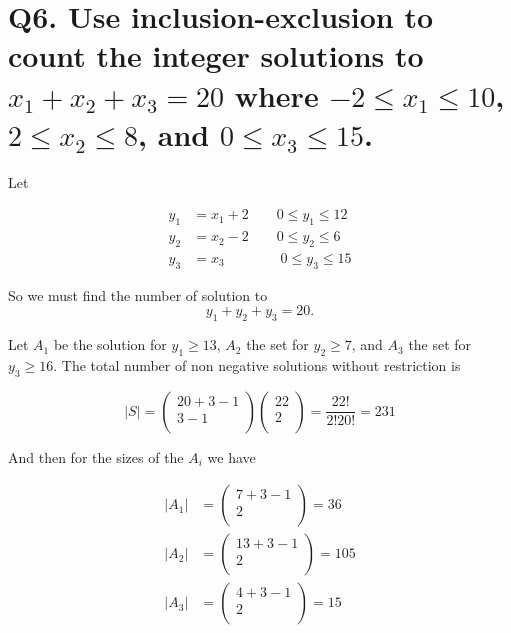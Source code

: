 \documentclass{article}
\begin{document}
\section*{Q6. \normalsize Use inclusion-exclusion to count the integer solutions to $x_1 + x_2 + x_3 = 20$ where $-2 \leq x_1 \leq 10$, $2 \leq x_2 \leq 8$, and $0 \leq x_3 \leq 15$.}

Let

\begin{align*}
  y_1 &= x_1 + 2 \qquad 0 \leq y_1 \leq 12 \\
  y_2 &= x_2 - 2 \qquad 0 \leq y_2 \leq 6 \\
  y_3 &= x_3 \qquad \quad \quad 0 \leq y_3 \leq 15
\end{align*}

So we must find the number of solution to $$y_1 + y_2 + y_3 = 20.$$  

Let $A_1$ be the solution for $y_1 \geq 13$, $A_2$ the set for $y_2 \geq 7$, and $A_3$ the set for $y_3 \geq 16$. The total number of non negative solutions without restriction is 

$$|S| = 
  \begin{pmatrix}
    20 + 3 - 1 \\ 3 - 1 \\ 
  \end{pmatrix}
  \begin{pmatrix}
    22 \\ 2 \\ 
  \end{pmatrix}
  = \frac{22!}{2!20!} = 231
$$

And then for the sizes of the $A_i$ we have

\begin{align*}
  |A_1| &= 
  \begin{pmatrix}
    7 + 3 - 1 \\ 2 \\ 
  \end{pmatrix}
  = 36 \\
  |A_2| &=
  \begin{pmatrix}
    13 + 3 - 1 \\ 2 \\ 
  \end{pmatrix}
  = 105 \\
  |A_3| &=
  \begin{pmatrix}
    4 + 3 - 1 \\ 2 \\ 
  \end{pmatrix}
  = 15 \\
\end{align*}
\end{document}

